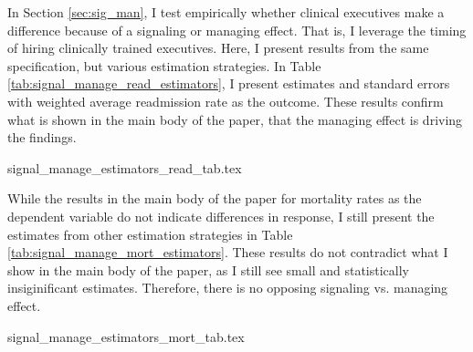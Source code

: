 \documentclass[12pt]{article}
\begin{document}
In Section \ref{sec:sig_man}, I test empirically whether clinical executives make a difference because of a signaling or managing effect. That is, I leverage the timing of hiring clinically trained executives. Here, I present results from the same specification, but various estimation strategies. In Table \ref{tab:signal_manage_read_estimators}, I present estimates and standard errors with weighted average readmission rate as the outcome. These results confirm what is shown in the main body of the paper, that the managing effect is driving the findings.  


{signal_manage_estimators_read_tab.tex}

While the results in the main body of the paper for mortality rates as the dependent variable do not indicate differences in response, I still present the estimates from other estimation strategies in Table \ref{tab:signal_manage_mort_estimators}. These results do not contradict what I show in the main body of the paper, as I still see small and statistically insiginificant estimates. Therefore, there is no opposing signaling vs. managing effect. 


{signal_manage_estimators_mort_tab.tex}




    

    

    

    

    

    

	
	
	
\end{document}
